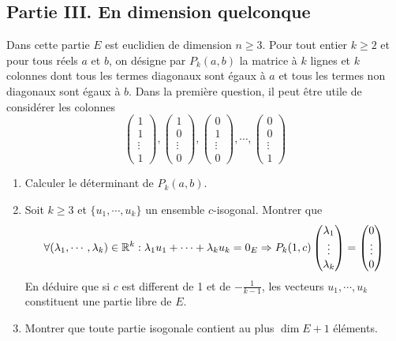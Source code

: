 \subsection*{Partie III. En dimension quelconque}
Dans cette partie $E$ est euclidien de dimension $n\geq3$.\newline
Pour tout entier $k\geq 2$ et pour tous r{\'e}els $a$ et $b$, on d{\'e}signe par $P_k(a,b)$ la matrice {\`a} $k$ lignes et $k$ colonnes dont tous les termes diagonaux sont {\'e}gaux {\`a} $a$ et tous les termes non diagonaux sont {\'e}gaux {\`a} $b$.\newline
Dans la première question, il peut être utile de considérer les colonnes
\begin{displaymath}
 \begin{pmatrix}
  1 \\ 1 \\ \vdots \\ 1
 \end{pmatrix}
,
 \begin{pmatrix}
  1 \\ 0 \\ \vdots \\ 0
 \end{pmatrix}
,
 \begin{pmatrix}
  0 \\ 1 \\ \vdots \\ 0
 \end{pmatrix}
,\cdots
,
 \begin{pmatrix}
  0 \\ 0 \\ \vdots \\ 1
 \end{pmatrix}
\end{displaymath}
\begin{enumerate}
\item Calculer le d{\'e}terminant de $P_k(a,b)$.
\item Soit $k\geq 3$ et $\{u_1,\cdots,u_k\}$ un ensemble $c$-isogonal. Montrer que 
\begin{displaymath}
\forall (\lambda_1,\cdots,\lambda_k)\in \mathbb{R}^k : \lambda_1 u_1 + \cdots +\lambda_ku_k=0_E 
\Rightarrow
P_k(1,c)
\begin{pmatrix}
 \lambda_1 \\ \vdots \\ \lambda_k         
\end{pmatrix}
=
\begin{pmatrix}
 0 \\ \vdots \\ 0         
\end{pmatrix}
\end{displaymath}
En d{\'e}duire que si $c$ est different de 1 et de $-\frac{1}{k-1}$, les vecteurs $u_1,\cdots,u_k$ constituent une partie libre de $E$.
\item Montrer que toute partie isogonale contient au plus $\dim E +1$ éléments.
\end{enumerate}

